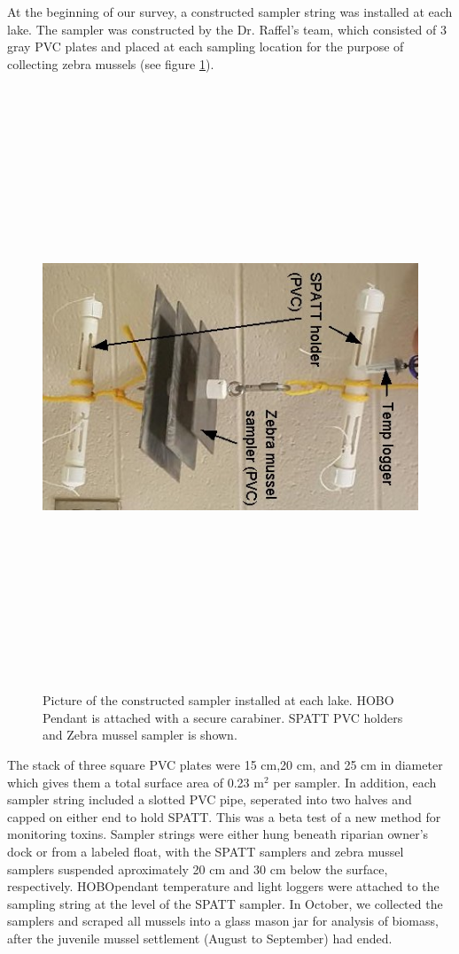 At the beginning of our survey, a constructed sampler string was installed at each lake. The sampler was constructed by the Dr. Raffel's team, which consisted of 3 gray PVC plates and placed at each sampling location for the purpose of collecting zebra mussels (see figure \ref{fig:samplerr}). 
\begin{figure}[!hp]
\centering
\includegraphics[width=\textwidth, height=18cm]{figures/samplers}
\caption{Picture of the constructed sampler installed at each lake. HOBO Pendant is attached with a secure carabiner. SPATT PVC holders and Zebra mussel sampler is shown.}
\label{fig:samplerr}
\end{figure}
The stack of three square PVC plates were  15 cm,20 cm, and 25 cm in diameter which gives them a total surface area of 0.23 m$^2$ per sampler. In addition, each sampler string included a slotted PVC pipe, seperated into two halves and capped on either end to hold SPATT. This was a beta test of a new method for monitoring toxins. Sampler strings were either hung beneath riparian owner's dock or from a labeled float, with the SPATT samplers and zebra mussel samplers suspended aproximately 20 cm and 30 cm below the surface, respectively. HOBO\texttrademark pendant temperature and light loggers were attached to the sampling string at the level of the SPATT sampler. In October, we collected the samplers and scraped all mussels into a glass mason jar for analysis of biomass, after the juvenile mussel settlement (August to September) had ended.




